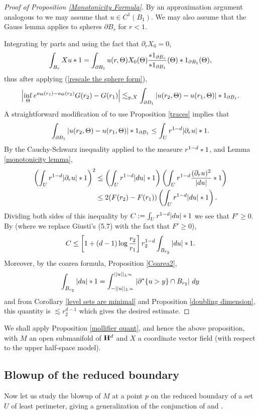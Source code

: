 \begin{proof}[Proof of Proposition \ref{Monotonicity Formula}]
By an approximation argument analogous to \cite[pg68]{Giusti77} we may assume that $u \in C^1(B_1)$.
We may also assume that the Gauss lemma applies to spheres $\partial B_r$ for $r < 1$.

Integrating by parts and using the fact that $\partial_r X_0 = 0$,
$$\int_{B_r} Xu *1 = \int_{\partial B_1} u(r, \Theta) X_0(\Theta) \frac{*1_{\partial B_r}}{*1_{\partial B_1}}(\Theta) *1_{\partial B_1}(\Theta),$$
thus after applying (\ref{rescale the sphere form}),
$$\left|\inf_\Theta e^{a_\Theta(r_1) - a_\Theta(r_2)}G(r_2) - G(r_1)\right| \lesssim_{g, X} \int_{\partial B_1} |u(r_2, \Theta) - u(r_1, \Theta)| *1_{\partial B_1}.$$
A straightforward modification of \cite[Lemma 5.3]{Giusti77} to use Proposition \ref{traces} implies that
$$\int_{\partial B_1} |u(r_2, \Theta) - u(r_1, \Theta)| *1_{\partial B_1} \leq \int_U r^{1 - d} |\partial_r u| *1.$$
By the Cauchy-Schwarz inequality applied to the measure $r^{1-d}*1$, and Lemma \ref{monotonicity lemma},
\begin{align*}
\left(\int_U r^{1 - d} |\partial_r u| *1 \right)^2 &\leq \left(\int_U r^{1 - d}|du|*1\right)\left(\int_U r^{1 - d}\frac{(\partial_ru)^2}{|du|} *1\right)\\
&\leq 2(F(r_2) - F(r_1))\left(\int_U r^{1 - d}|du|*1\right).
\end{align*}
Dividing both sides of this inequality by $C := \int_U r^{1 - d} |du|*1$ we see that $F' \geq 0$.
By \cite[Lemma 5.11]{Giusti77} (where we replace Giusti's (5.7) with the fact that $F' \geq 0$),
$$C \leq \left[1 + (d - 1) \log \frac{r_2}{r_1}\right] r_2^{1 - d} \int_{B_{r_2}} |du| *1.$$
Moreover, by the coarea formula, Proposition \ref{Coarea2},
$$\int_{B_{r_2}} |du| *1 = \int_{-||u||_{L^\infty}}^{||u||_{L^\infty}} |\partial^* \{u > y\} \cap B_{r_2}| ~dy$$
and from Corollary \ref{level sets are minimal} and Proposition \ref{doubling dimension}, this quantity is $\lesssim r_2^{d - 1}$ which gives the desired estimate.
\end{proof}

We shall apply Proposition \ref{mollifier quant}, and hence the above proposition, with $M$ an open submanifold of $\mathbf H^d$ and $X$ a coordinate vector field (with respect to the upper half-space model).



\subsection{Blowup of the reduced boundary}
Now let us study the blowup of $M$ at a point $p$ on the reduced boundary of a set $U$ of least perimeter, giving a generalization of the conjunction of \cite[Theorem 9.3]{Giusti77} and \cite[Theorem 6.2.2]{Simons68}.

